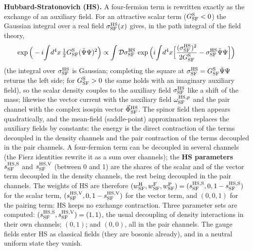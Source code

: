 \documentclass[
  10pt,
]{article}
\begin{document}
\textbf{Hubbard-Stratonovich (HS).} A four-fermion term is rewritten
exactly as the exchange of an auxiliary field. For an attractive scalar
term (\(G^{\rm S}_{\rm SF}<0\)) the Gaussian integral over a real field
\(\sigma^{\rm HS}_{\rm SF}(x)\) gives, in the path integral of the field
theory,
\[\exp\Big(-i\!\int\!d^4x\,\tfrac12G^{\rm S}_{\rm SF}(\bar\Psi\Psi)^2\Big)\propto\int\mathcal D\sigma^{\rm HS}_{\rm SF}\,\exp\Big(i\!\int\!d^4x\Big[\frac{(\sigma^{\rm HS}_{\rm SF})^2}{2G^{\rm S}_{\rm SF}}-\sigma^{\rm HS}_{\rm SF}\bar\Psi\Psi\Big]\Big)\]
(the integral over \(\sigma^{\rm HS}_{\rm SF}\) is Gaussian; completing
the square at
\(\sigma^{\rm HS}_{\rm SF}=G^{\rm S}_{\rm SF}\bar\Psi\Psi\) returns the
left side; for \(G^{\rm S}_{\rm SF}>0\) the same holds with an imaginary
auxiliary field), so the scalar density couples to the auxiliary field
\(\sigma^{\rm HS}_{\rm SF}\) like a shift of the mass; likewise the
vector current with the auxiliary field \(\omega^{{\rm HS},p}_{\rm SF}\)
and the pair channel with the complex isospin vector
\(\vec\Phi^{\rm HS}_{\rm SF}\). The spinor field then appears
quadratically, and the mean-field (saddle-point) approximation replaces
the auxiliary fields by constants: the energy is the direct contraction
of the terms decoupled in the density channels and the pair contraction
of the terms decoupled in the pair channels. A four-fermion term can be
decoupled in several channels (the Fierz identities rewrite it as a sum
over channels); the \textbf{HS parameters} \(s^{\rm HS,S}_{\rm SF}\) and
\(s^{\rm HS,V}_{\rm SF}\) (between 0 and 1) are the shares of the scalar
and of the vector term decoupled in the density channels, the rest being
decoupled in the pair channels. The weights of HS are therefore
\((w^{\rm H}_{\rm SF},w^{\rm F}_{\rm SF},w^{\rm P}_{\rm SF})=(s^{\rm HS,S}_{\rm SF},0,1-s^{\rm HS,S}_{\rm SF})\)
for the scalar term,
\((s^{\rm HS,V}_{\rm SF},0,1-s^{\rm HS,V}_{\rm SF})\) for the vector
term, and \((0,0,1)\) for the pairing term: HS keeps no exchange
contraction. Three parameter sets are computed:
\((s^{\rm HS,S}_{\rm SF},s^{\rm HS,V}_{\rm SF})=(1,1)\), the usual
decoupling of density interactions in their own channels; \((0,1)\); and
\((0,0)\), all in the pair channels. The gauge fields enter HS as
classical fields (they are bosonic already), and in a neutral uniform
state they vanish.
\end{document}
